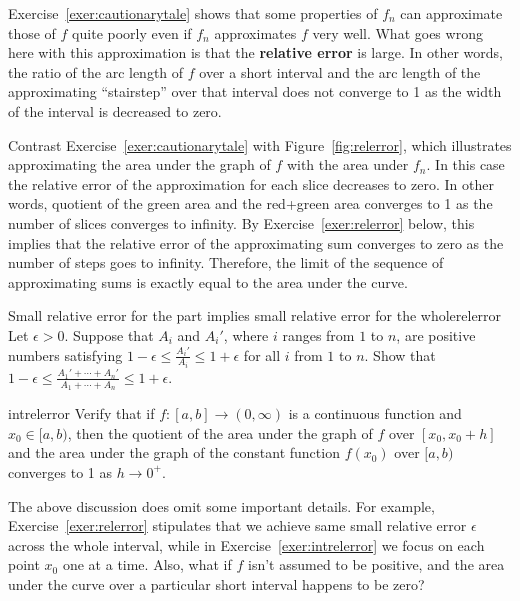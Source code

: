 \documentclass{watsonbook}
\begin{document}
Exercise~\ref{exer:cautionarytale} shows that some properties of $f_n$
can approximate those of $f$ quite poorly even if $f_n$ approximates
$f$ very well. What goes wrong here with this approximation is that
the \textbf{relative error} is large. In other words, the ratio of the
arc length of $f$ over a short interval and the arc length of the
approximating ``stairstep'' over that interval does not converge to 1
as the width of the interval is decreased to zero.

Contrast Exercise~\ref{exer:cautionarytale} with
Figure~\ref{fig:relerror}, which illustrates approximating the area
under the graph of $f$ with the area under $f_n$. In this case the
relative error of the approximation for each slice decreases to
zero. In other words, quotient of the green area and the red+green
area converges to 1 as the number of slices converges to infinity. By
Exercise~\ref{exer:relerror} below, this implies that the relative
error of the approximating sum converges to zero as the number of
steps goes to infinity. Therefore, the limit of the sequence of
approximating sums is exactly equal to the area under the curve.

\begin{exercise}{Small relative error for the part implies small
    relative error for the whole}{relerror}
  Let $\epsilon > 0$. Suppose that $A_i$ and $A_i'$, where $i$ ranges
  from $1$ to $n$, are positive numbers satisfying
  $1-\epsilon \leq \frac{A_{i}'}{A_{i}} \leq 1 + \epsilon$ for all $i$
  from $1$ to $n$. Show that
  $1-\epsilon \leq \frac{A_1'+\cdots+A_n'}{A_1+\cdots+A_n} \leq 1 +
  \epsilon$.  
\end{exercise}

\begin{exercise}{}{intrelerror}
  Verify that if $f:[a,b] \to (0,\infty)$ is a continuous function and
  $x_0 \in [a,b)$, then the quotient of the area under the graph of $f$ over
  $[x_0,x_0+h]$ and the area under the graph of the constant function
  $f(x_0)$ over $[a,b)$ converges to 1 as $h \to 0^+$. 
\end{exercise}

The above discussion does omit some important details. For example,
Exercise~\ref{exer:relerror} stipulates that we achieve same small
relative error $\epsilon$ across the whole interval, while in
Exercise~\ref{exer:intrelerror} we focus on each point $x_0$ one at a
time. Also, what if $f$ isn't assumed to be positive, and the area
under the curve over a particular short interval happens to be zero?
\end{document}
